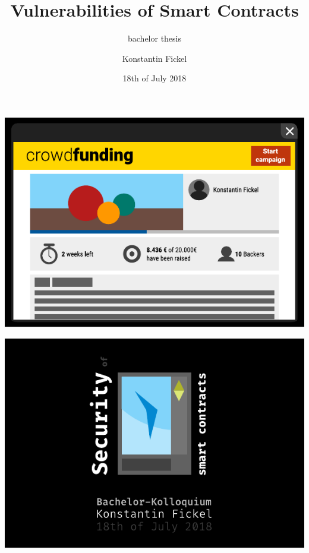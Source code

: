 \documentclass[xcolor=x11names,compress]{beamer}
\title{Vulnerabilities of Smart Contracts}
\subtitle{bachelor thesis}
\author{Konstantin Fickel}
\date{18th of July 2018}
\begin{document}
\begin{frame}[plain]
\end{frame}

\begin{frame}
	\begin{center}
		\includegraphics[width=\textwidth,height=0.8\textheight,keepaspectratio]{img/crowdfunding/01.pdf}
	\end{center}
\end{frame}

\begin{frame}[plain]
	\begin{center}
		\includegraphics[width=\textwidth,height=0.8\textheight,keepaspectratio]{img/cover.pdf}
	\end{center}
\end{frame}
\end{document}

